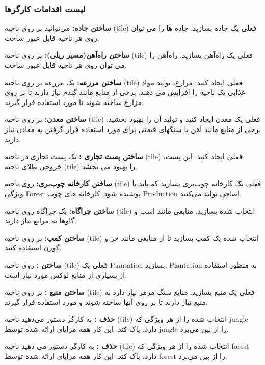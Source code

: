 \documentclass[]{article}
\begin{document}
\subsubsection*{{\titr لیست اقدامات کارگرها}}
\noindent \textbf{ساختن جاده:} می‌توانید بر روی ناحیه‌ (tile) فعلی یک جاده بسازید. جاده ها را می توان روی هر ناحیه قابل عبور ساخت.

\noindent \textbf{ساختن راه‌آهن(مسیر ریلی):} بر روی ناحیه‌ (tile) فعلی یک راه‌آهن بسازید. راه‌آهن را می توان روی هر ناحیه قابل عبور ساخت.

\noindent \textbf{ساختن مرزعه:} یک مزرعه بر روی ناحیه‌ (tile) فعلی ایجاد کنید. مزارع، تولید مواد غذایی یک ناحیه را افزایش می دهند. برخی از منابع مانند گندم نیاز دارند تا بر روی مزارع ساخته شوند تا مورد استفاده قرار گیرند.

\noindent \textbf{ساختن معدن:} بر روی ناحیه‌ (tile) فعلی یک معدن ایجاد کنید و تولید آن را بهبود بخشید. برخی از منابع مانند آهن یا سنگهای قیمتی برای مورد استفاده قرار گرفتن به معادن نیاز دارند.

\noindent \textbf{ساختن پست تجاری :} یک پست تجاری در ناحیه‌ (tile) فعلی ایجاد کنید. این پست، خروجی طلای ناحیه‌ (tile) را بهبود می بخشد.

\noindent \textbf{ساختن کارخانه چوب‌بری:} روی ناحیه‌ (tile) فعلی یک کارخانه چوب‌بری بسازید که باید با ویژگی Forest پوشیده شود. کارخانه های چوب Production اضافی تولید می‌کنند.

\noindent \textbf{ساختن چراگاه:} یک چراگاه روی ناحیه‌ (tile) انتخاب شده بسازید. منابعی مانند اسب و گاوها به مراتع نیاز دارند.

\noindent \textbf{ساختن کمپ:} بر روی ناحیه‌ (tile) انتخاب شده یک کمپ بسازید تا از منابعی مانند خز و گوزن استفاده کنید.

\noindent \textbf{ساختن :} روی ناحیه‌ (tile) فعلی یک Plantation بسازید. Plantation به منظور استفاده از بسیاری از منابع لوکس مورد نیاز است.

\noindent \textbf{ساختن منبع :} بر روی ناحیه‌ (tile) فعلی یک منبع بسازید. منابع سنگ مرمر نیاز دارد به منبع نیاز دارند تا بر روی آنها ساخته شوند و مورد استفاده قرار گیرند.

\noindent \textbf{حذف :} به کارگر دستور می‌دهید ناحیه‌ (tile) انتخاب شده را از هر ویژگی که jungle دارد، پاک کند. این کار همه مزایای ارائه شده توسط jungle را از بین می‌برد.

\noindent \textbf{حذف :} به کارگر دستور می دهید ناحیه‌ (tile) انتخاب شده را از هر ویژگی که forest دارد، پاک کند. این کار همه مزایای ارائه شده توسط forest را از بین می‌برد.
\end{document}
